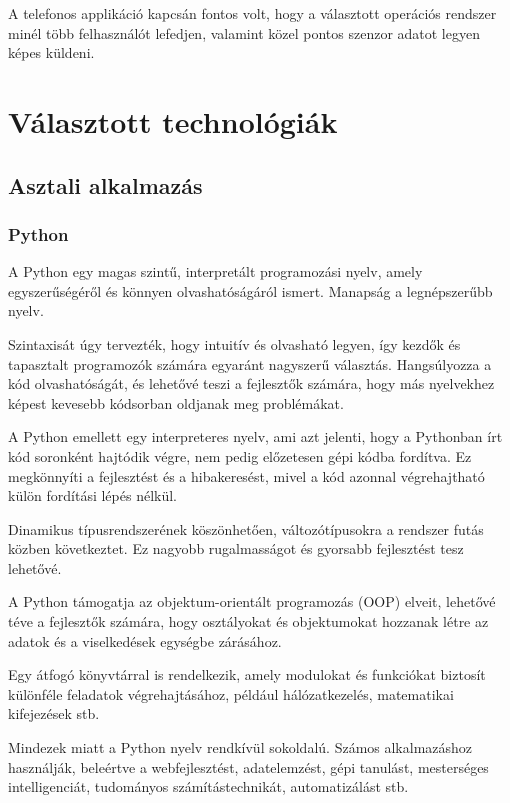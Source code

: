 \documentclass[
]{thesis-ekf}
\theoremstyle{definition}
\theoremstyle{remark}
\begin{document}
A telefonos applikáció kapcsán fontos volt, hogy a választott operációs rendszer minél több felhasználót lefedjen, valamint közel pontos szenzor adatot legyen képes küldeni.

\section{Választott technológiák}
\subsection{Asztali alkalmazás}
\subsubsection{Python}
A Python egy magas szintű, interpretált programozási nyelv, amely egyszerűségéről és könnyen olvashatóságáról ismert. Manapság a legnépszerűbb nyelv.

Szintaxisát úgy tervezték, hogy intuitív és olvasható legyen, így kezdők és tapasztalt programozók számára egyaránt nagyszerű választás. Hangsúlyozza a kód olvashatóságát, és lehetővé teszi a fejlesztők számára, hogy más nyelvekhez képest kevesebb kódsorban oldjanak meg problémákat.\cite{Python}

A Python emellett egy interpreteres  nyelv, ami azt jelenti, hogy a Pythonban írt kód soronként hajtódik végre, nem pedig előzetesen gépi kódba fordítva. Ez megkönnyíti a fejlesztést és a hibakeresést, mivel a kód azonnal végrehajtható külön fordítási lépés nélkül.

Dinamikus típusrendszerének köszönhetően, változótípusokra a rendszer futás közben következtet. Ez nagyobb rugalmasságot és gyorsabb fejlesztést tesz lehetővé.

A Python támogatja az objektum-orientált programozás (OOP) elveit, lehetővé téve a fejlesztők számára, hogy osztályokat és objektumokat hozzanak létre az adatok és a viselkedések egységbe zárásához.

Egy átfogó könyvtárral is rendelkezik, amely modulokat és funkciókat biztosít különféle feladatok végrehajtásához, például hálózatkezelés, matematikai kifejezések stb.

Mindezek miatt a Python nyelv rendkívül sokoldalú. Számos alkalmazáshoz használják, beleértve a webfejlesztést, adatelemzést, gépi tanulást, mesterséges intelligenciát, tudományos számítástechnikát, automatizálást stb.
\end{document}

